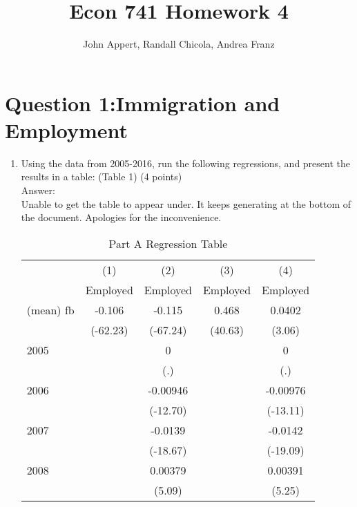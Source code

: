 \documentclass{article}
\begin{document}
\title{Econ 741 Homework 4}
\author{John Appert, Randall Chicola, Andrea Franz}
\maketitle
\section{Question 1:Immigration and Employment} 


\begin{enumerate}[label=\alph*]
\item Using the data from 2005-2016, run the following regressions, and present the
results in a table: (Table 1) (4 points)\\

Answer:\\
Unable to get the table to appear under. It keeps generating at the bottom of the document. Apologies for the inconvenience.
\begin{table}[htbp]\centering
\caption{Part A Regression Table\label{tab1}}
\begin{tabular}{l*{4}{c}}
\hline\hline
                    &\multicolumn{1}{c}{(1)}&\multicolumn{1}{c}{(2)}&\multicolumn{1}{c}{(3)}&\multicolumn{1}{c}{(4)}\\
                    &\multicolumn{1}{c}{Employed}&\multicolumn{1}{c}{Employed}&\multicolumn{1}{c}{Employed}&\multicolumn{1}{c}{Employed}\\
\hline
(mean) fb           &      -0.106&      -0.115&       0.468&      0.0402\\
                    &    (-62.23)&    (-67.24)&     (40.63)&      (3.06)\\
[1em]
2005                &            &           0&            &           0\\
                    &            &         (.)&            &         (.)\\
[1em]
2006                &            &    -0.00946&            &    -0.00976\\
                    &            &    (-12.70)&            &    (-13.11)\\
[1em]
2007                &            &     -0.0139&            &     -0.0142\\
                    &            &    (-18.67)&            &    (-19.09)\\
[1em]
2008                &            &     0.00379&            &     0.00391\\
                    &            &      (5.09)&            &      (5.25)\\

\end{tabular}
\end{table}
\end{enumerate}
\end{document}
